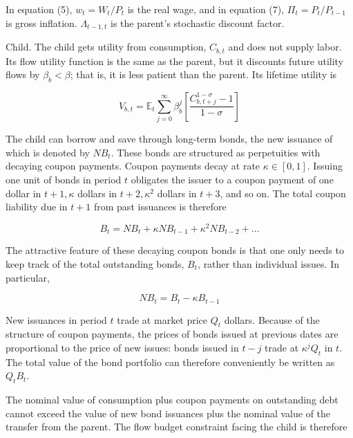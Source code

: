 \documentclass[10pt]{article}
\begin{document}
In equation (5), $w_{t}=W_{t} / P_{t}$ is the real wage, and in equation (7), $\Pi_{t}=P_{t} / P_{t-1}$ is gross inflation. $\Lambda_{t-1, t}$ is the parent's stochastic discount factor.

Child. The child gets utility from consumption, $C_{b, t}$ and does not supply labor. Its flow utility function is the same as the parent, but it discounts future utility flows by $\beta_{b}<\beta$; that is, it is less patient than the parent. Its lifetime utility is

\begin{equation*}
V_{b, t}=\mathbb{E}_{t} \sum_{j=0}^{\infty} \beta_{b}^{j}\left[\frac{C_{b, t+j}^{1-\sigma}-1}{1-\sigma}\right] \tag{8}
\end{equation*}

The child can borrow and save through long-term bonds, the new issuance of which is denoted by $N B_{t}$. These bonds are structured as perpetuities with decaying coupon payments. Coupon payments decay at rate $\kappa \in[0,1]$. Issuing one unit of bonds in period $t$ obligates the issuer to a coupon payment of one dollar in $t+1, \kappa$ dollars in $t+2, \kappa^{2}$ dollars in $t+3$, and so on. The total coupon liability due in $t+1$ from past issuances is therefore

\begin{equation*}
B_{t}=N B_{t}+\kappa N B_{t-1}+\kappa^{2} N B_{t-2}+\ldots \tag{9}
\end{equation*}

The attractive feature of these decaying coupon bonds is that one only needs to keep track of the total outstanding bonds, $B_{t}$, rather than individual issues. In particular,

\begin{equation*}
N B_{t}=B_{t}-\kappa B_{t-1} \tag{10}
\end{equation*}

New issuances in period $t$ trade at market price $Q_{t}$ dollars. Because of the structure of coupon payments, the prices of bonds issued at previous dates are proportional to the price of new issues: bonds issued in $t-j$ trade at $\kappa^{j} Q_{t}$ in $t$. The total value of the bond portfolio can therefore conveniently be written as $Q_{t} B_{t}$.

The nominal value of consumption plus coupon payments on outstanding debt cannot exceed the value of new bond issuances plus the nominal value of the transfer from the parent. The flow budget constraint facing the child is therefore
\end{document}
